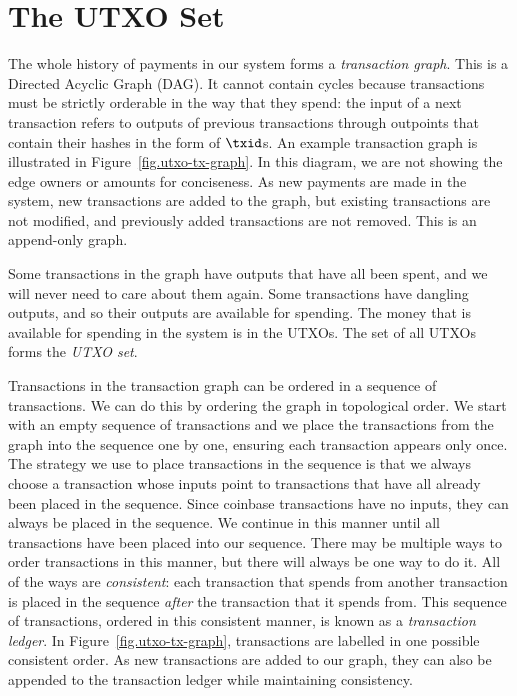 \section{The UTXO Set}

The whole history of payments in our system forms a \emph{transaction graph}.
This is a Directed Acyclic Graph (DAG). It cannot contain cycles because transactions must be
strictly orderable in the way that they spend: the input of a next transaction refers to
outputs of previous transactions through outpoints that contain their hashes in the form of $\txid$s.
An example transaction graph is illustrated in Figure~\ref{fig.utxo-tx-graph}. In this diagram,
we are not showing the edge owners or amounts for conciseness. As new payments are made in the system,
new transactions are added to the graph, but existing transactions are not modified, and previously
added transactions are not removed. This is an append-only graph.

Some transactions in the graph have outputs that have all been spent, and we will never need to care
about them again. Some transactions have dangling outputs, and so their outputs are available for
spending. The money that is available for spending in the system is in the UTXOs. The set of all UTXOs
forms the \emph{UTXO set}.

Transactions in the transaction graph can be ordered in a sequence of transactions. We can do this
by ordering the graph in topological order. We start with an empty sequence of transactions and we
place the transactions from the graph into the sequence one by one, ensuring each transaction appears
only once. The strategy we use to place transactions in the sequence is that we always choose a transaction
whose inputs point to transactions that have all already
been placed in the sequence. Since coinbase transactions have no inputs, they can always be placed in the sequence.
We continue
in this manner until all transactions have been placed into our sequence. There may be multiple
ways to order transactions in this manner, but there will always be one way to do it. All of the ways
are \emph{consistent}: each transaction
that spends from another transaction is placed in the sequence \emph{after} the transaction that it spends
from. This sequence of transactions, ordered in this consistent manner, is known as a
\emph{transaction ledger}. In Figure~\ref{fig.utxo-tx-graph}, transactions are labelled
in one possible consistent order. As new transactions are added to our graph, they can also be appended
to the transaction ledger while maintaining consistency.

